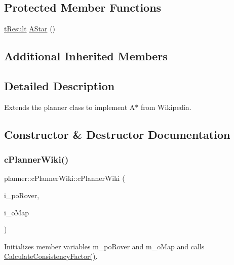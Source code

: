 \subsection*{Protected Member Functions}
\begin{DoxyCompactItemize}
\item 
\mbox{\hyperlink{structt_result}{t\+Result}} \mbox{\hyperlink{classplanner_1_1c_planner_wiki_aa673ebc2b1b43af3b13fb0c958c5f2e4}{A\+Star}} ()
\end{DoxyCompactItemize}
\subsection*{Additional Inherited Members}


\subsection{Detailed Description}
Extends the planner class to implement A$\ast$ from Wikipedia. 

\subsection{Constructor \& Destructor Documentation}
\mbox{\label{classplanner_1_1c_planner_wiki_aed6ae97e85a338e082ec2879629f0f3b}} 
\subsubsection{\texorpdfstring{c\+Planner\+Wiki()}{cPlannerWiki()}}
{\footnotesize\ttfamily planner\+::c\+Planner\+Wiki\+::c\+Planner\+Wiki (\begin{DoxyParamCaption}\item[{std\+::shared\+\_\+ptr$<$ \mbox{\hyperlink{classplanner_1_1c_rover_interface}{c\+Rover\+Interface}}$<$ 8 $>$$>$}]{i\+\_\+po\+Rover,  }\item[{std\+::shared\+\_\+ptr$<$ \mbox{\hyperlink{classplanner_1_1c_graph}{c\+Graph}} $>$}]{i\+\_\+o\+Map }\end{DoxyParamCaption})}



Initializes member variables m\+\_\+po\+Rover and m\+\_\+o\+Map and calls \mbox{\hyperlink{classplanner_1_1c_planner_a2e5a745f83f903662eff914d8beddb5e}{Calculate\+Consistency\+Factor()}}. 

